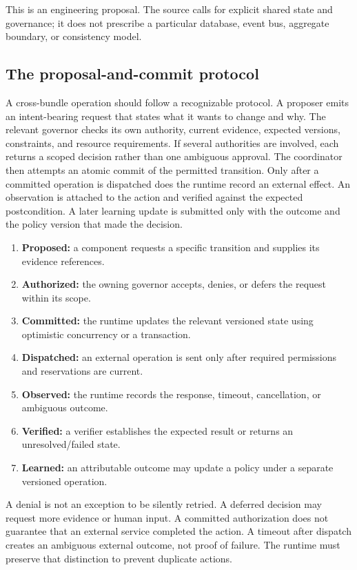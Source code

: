 This is an engineering proposal. The source calls for explicit shared state and governance; it does not prescribe a particular database, event bus, aggregate boundary, or consistency model.

\subsection{The proposal-and-commit protocol}
\label{subsec:ch18-proposal-commit}

A cross-bundle operation should follow a recognizable protocol. A proposer emits an intent-bearing request that states what it wants to change and why. The relevant governor checks its own authority, current evidence, expected versions, constraints, and resource requirements. If several authorities are involved, each returns a scoped decision rather than one ambiguous approval. The coordinator then attempts an atomic commit of the permitted transition. Only after a committed operation is dispatched does the runtime record an external effect. An observation is attached to the action and verified against the expected postcondition. A later learning update is submitted only with the outcome and the policy version that made the decision.

\begin{enumerate}
  \item \textbf{Proposed:} a component requests a specific transition and supplies its evidence references.
  \item \textbf{Authorized:} the owning governor accepts, denies, or defers the request within its scope.
  \item \textbf{Committed:} the runtime updates the relevant versioned state using optimistic concurrency or a transaction.
  \item \textbf{Dispatched:} an external operation is sent only after required permissions and reservations are current.
  \item \textbf{Observed:} the runtime records the response, timeout, cancellation, or ambiguous outcome.
  \item \textbf{Verified:} a verifier establishes the expected result or returns an unresolved/failed state.
  \item \textbf{Learned:} an attributable outcome may update a policy under a separate versioned operation.
\end{enumerate}

A denial is not an exception to be silently retried. A deferred decision may request more evidence or human input. A committed authorization does not guarantee that an external service completed the action. A timeout after dispatch creates an ambiguous external outcome, not proof of failure. The runtime must preserve that distinction to prevent duplicate actions.

